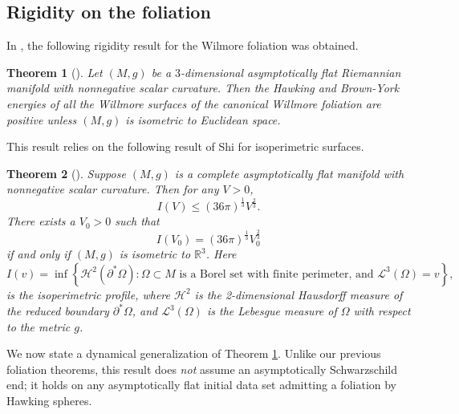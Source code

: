 \documentclass[12pt,a4paper]{amsart}
\theoremstyle{plain}
\newtheorem{theorem}{Theorem}[section]
\theoremstyle{definition}
\begin{document}
\subsection{Rigidity on the foliation}


In \cite{rigidiaz}, the following rigidity result for the Wilmore foliation was obtained.
\begin{theorem} [{\cite[Theorem 2.16]{rigidiaz}}]  \label{rigidityfoli}
    Let \((M, g)\) be a $3$-dimensional asymptotically flat  Riemannian manifold with nonnegative  scalar curvature. Then the Hawking  and  Brown-York energies of all the  Willmore surfaces of the canonical Willmore foliation  are positive unless $(M,g)$ is isometric to Euclidean space.
\end{theorem}
This  result relies on the following result of Shi  for isoperimetric surfaces.
\begin{theorem}[{\cite[Theorem 3]{shi2016isoperimetric}}]\label{isoperig}
    Suppose \((M, g)\) is a complete  asymptotically flat manifold with nonnegative scalar curvature. Then for any  \(V > 0\),
\begin{equation}
I(V) \leq (36\pi)^{\frac{1}{3}} V^{\frac{2}{3}}. 
\end{equation}
There exists a  \(V_0 > 0\) such that
\begin{equation}
I(V_0) = (36\pi)^{\frac{1}{3}} V_0^{\frac{2}{3}} 
\end{equation}
if and only if \((M, g)\) is isometric to \(\mathbb{R}^3\). Here
\[
I(v) = \inf \left\{ \mathcal{H}^2(\partial^* \Omega) : \Omega \subset M \text{ is a Borel set with finite perimeter, and } \mathcal{L}^3(\Omega) = v \right\},
\]
is the isoperimetric profile, where \(\mathcal{H}^2\) is the 2-dimensional Hausdorff measure of the reduced boundary \(\partial^* \Omega\), and \(\mathcal{L}^3(\Omega)\) is the Lebesgue measure of \(\Omega\) with respect to the metric \(g\).
\end{theorem}
We now state a dynamical generalization of Theorem \ref{rigidityfoli}. Unlike our previous foliation theorems, this result does \emph{not} assume an asymptotically Schwarzschild end; it holds on any asymptotically flat initial data set admitting a foliation by Hawking spheres.
\end{document}
